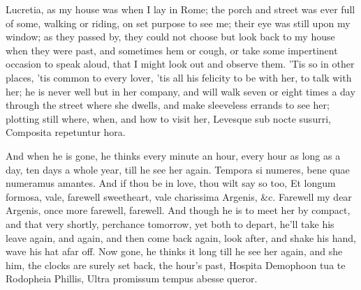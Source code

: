 {Lucretia, as my house was when I lay in Rome; the porch and street was
ever full of some, walking or riding, on set purpose to see me; their
eye was still upon my window; as they passed by, they could not choose
but look back to my house when they were past, and sometimes hem or
cough, or take some impertinent occasion to speak aloud, that I might
look out and observe them. 'Tis so in other places, 'tis common to
every lover, 'tis all his felicity to be with her, to talk with her; he
is never well but in her company, and will walk  seven or eight
times a day through the street where she dwells, and make sleeveless
errands to see her; plotting still where, when, and how to visit her,
Levesque sub nocte susurri,
Composita repetuntur hora.

And when he is gone, he thinks every minute an hour, every hour as long
as a day, ten days a whole year, till he see her again. Tempora
si numeres, bene quae numeramus amantes. And if thou be in love, thou
wilt say so too, Et longum formosa, vale, farewell sweetheart, vale
charissima Argenis, \&c. Farewell my dear Argenis, once more farewell,
farewell. And though he is to meet her by compact, and that very
shortly, perchance tomorrow, yet both to depart, he'll take his leave
again, and again, and then come back again, look after, and shake his
hand, wave his hat afar off. Now gone, he thinks it long till he see
her again, and she him, the clocks are surely set back, the hour's
past,
Hospita Demophoon tua te Rodopheia Phillis,
Ultra promissum tempus abesse queror.

}
